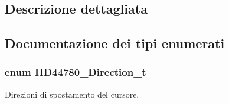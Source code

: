 \subsection{Descrizione dettagliata}


\subsection{Documentazione dei tipi enumerati}
\hypertarget{group___l_c_d_gaf46f4db4f981d3a1088804a6d6980d30}{
\subsubsection[{H\+D44780\+\_\+\+Direction\+\_\+t}]{\setlength{\rightskip}{0pt plus 5cm}enum {\bf H\+D44780\+\_\+\+Direction\+\_\+t}}}\label{group___l_c_d_gaf46f4db4f981d3a1088804a6d6980d30}


Direzioni di spostamento del cursore. 

